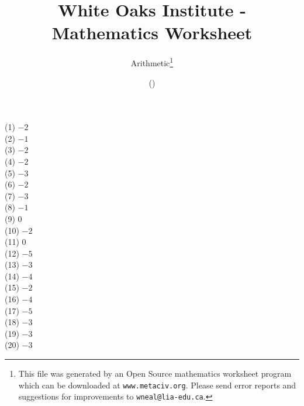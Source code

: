 \documentclass[letter]{article}
\begin{document}
\title{White Oaks Institute - Mathematics Worksheet}
\author{Arithmetic\thanks{This file was generated by an \textsf{Open Source} mathematics worksheet program which can be downloaded at \texttt{www.metaciv.org}. Please send error reports and suggestions for improvements to \texttt{wneal@lia-edu.ca}.}}
\date{\XCfileversion{} (\XCfiledate)}
\maketitle
\setlength{\parskip}{12mm plus 4mm minus 4mm}\setlength{\parindent}{0cm}\begin{multicols}{2}(1) $-2$\\(2) $-1$\\(3) $-2$\\(4) $-2$\\(5) $-3$\\(6) $-2$\\(7) $-3$\\(8) $-1$\\(9) $0$\\(10) $-2$\\(11) $0$\\(12) $-5$\\(13) $-3$\\(14) $-4$\\(15) $-2$\\(16) $-4$\\(17) $-5$\\(18) $-3$\\(19) $-3$\\(20) $-3$\\\end{multicols}
\end{document}
